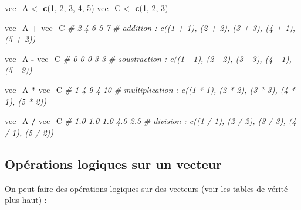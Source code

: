 \documentclass[
]{book}
\newenvironment{Shaded}{\begin{snugshade}}{\end{snugshade}}
\newcommand{\CommentTok}[1]{\textcolor[rgb]{0.56,0.35,0.01}{\textit{#1}}}
\newcommand{\DecValTok}[1]{\textcolor[rgb]{0.00,0.00,0.81}{#1}}
\newcommand{\FunctionTok}[1]{\textcolor[rgb]{0.13,0.29,0.53}{\textbf{#1}}}
\newcommand{\NormalTok}[1]{#1}
\newcommand{\OtherTok}[1]{\textcolor[rgb]{0.56,0.35,0.01}{#1}}
\newcommand{\SpecialCharTok}[1]{\textcolor[rgb]{0.81,0.36,0.00}{\textbf{#1}}}
\begin{document}
\begin{Shaded}
\begin{Highlighting}[]
\NormalTok{vec\_A }\OtherTok{\textless{}{-}} \FunctionTok{c}\NormalTok{(}\DecValTok{1}\NormalTok{, }\DecValTok{2}\NormalTok{, }\DecValTok{3}\NormalTok{, }\DecValTok{4}\NormalTok{, }\DecValTok{5}\NormalTok{)}
\NormalTok{vec\_C }\OtherTok{\textless{}{-}} \FunctionTok{c}\NormalTok{(}\DecValTok{1}\NormalTok{, }\DecValTok{2}\NormalTok{, }\DecValTok{3}\NormalTok{)}

\NormalTok{vec\_A }\SpecialCharTok{+}\NormalTok{ vec\_C }\CommentTok{\# 2 4 6 5 7}
\CommentTok{\# addition : c((1 + 1), (2 + 2), (3 + 3), (4 + 1), (5 + 2))}

\NormalTok{vec\_A }\SpecialCharTok{{-}}\NormalTok{ vec\_C }\CommentTok{\# 0 0 0 3 3}
\CommentTok{\# soustraction : c((1 {-} 1), (2 {-} 2), (3 {-} 3), (4 {-} 1), (5 {-} 2))}

\NormalTok{vec\_A }\SpecialCharTok{*}\NormalTok{ vec\_C  }\CommentTok{\# 1  4  9  4 10}
\CommentTok{\# multiplication : c((1 * 1), (2 * 2), (3 * 3), (4 * 1), (5 * 2))}

\NormalTok{vec\_A }\SpecialCharTok{/}\NormalTok{ vec\_C }\CommentTok{\# 1.0 1.0 1.0 4.0 2.5}
\CommentTok{\# division : c((1 / 1), (2 / 2), (3 / 3), (4 / 1), (5 / 2))}
\end{Highlighting}
\end{Shaded}

\subsection{Opérations logiques sur un vecteur}\label{opuxe9rations-logiques-sur-un-vecteur}

On peut faire des opérations logiques sur des vecteurs (voir les tables de vérité plus haut) :
\end{document}
